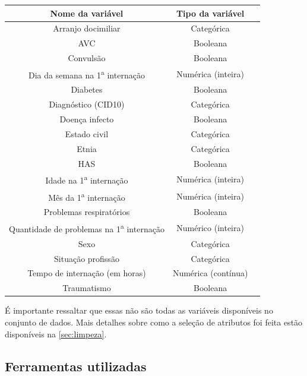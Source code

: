 \begin{table}[H]
	{
		\begin{tabular}{ccc}
			\toprule
			\textbf{Nome da variável} & \textbf{Tipo da variável} \\
			\midrule \midrule
   			Arranjo docimiliar & Categórica \\
   			\midrule
			AVC & Booleana \\
			\midrule
			Convulsão & Booleana \\
			\midrule
			Dia da semana na 1\textsuperscript{a} internação & Numérica (inteira) \\
			\midrule
			Diabetes & Booleana \\
			\midrule
			Diagnóstico (CID10) & Categórica \\
			\midrule
			Doença infecto & Booleana \\
			\midrule
			Estado civil & Categórica \\
			\midrule
			Etnia & Categórica \\
			\midrule
			HAS & Booleana \\
			\midrule
			Idade na 1\textsuperscript{a} internação & Numérica (inteira) \\
			\midrule
			Mês da 1\textsuperscript{a} internação & Numérica (inteira) \\
			\midrule
			Problemas respiratórios & Booleana \\
			\midrule
			Quantidade de problemas na 1\textsuperscript{a} internação & Numérico (inteira) \\
			\midrule
			Sexo & Categórica \\
			\midrule
			Situação profissão & Categórica \\
			\midrule
			Tempo de internação (em horas) & Numérica (contínua) \\
			\midrule
			Traumatismo & Booleana \\
			\bottomrule
		\end{tabular}
	}
	{
	}
\end{table}

É importante ressaltar que essas não são todas as variáveis disponíveis no conjunto de dados. Mais detalhes sobre como a seleção de atributos foi feita estão disponíveis na \autoref{sec:limpeza}.

\subsection{Ferramentas utilizadas}\label{sec:ferramentas}

